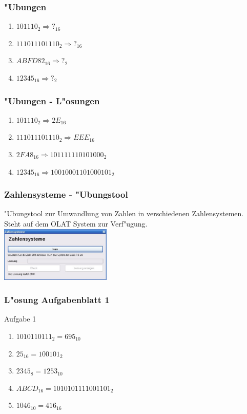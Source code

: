 \documentclass{beamer}
\begin{document}
\frame
{
	\frametitle{"Ubungen}
	\begin{enumerate}
	\item $101110_{2} \Rightarrow ?_{16}$
	\item $111011101110_{2} \Rightarrow ?_{16}$
	\item $ABFD82_{16} \Rightarrow ?_{2}$
	\item $12345_{16} \Rightarrow ?_{2}$
	\end{enumerate}
}

\frame
{
	\frametitle{"Ubungen - L"osungen}
	\begin{enumerate}
	\item $101110_{2} \Rightarrow 2E_{16}$
	\item $111011101110_{2} \Rightarrow EEE_{16}$
	\item $2FA8_{16} \Rightarrow 101111110101000_{2}$
	\item $12345_{16} \Rightarrow 10010001101000101_{2}$
	\end{enumerate}
}

\frame
{
	\frametitle{Zahlensysteme - "Ubungstool}
	"Ubungstool zur Umwandlung von Zahlen in verschiedenen Zahlensystemen. Steht auf dem OLAT System zur Verf"ugung.\\
	\includegraphics[width=150pt]{zahlensysteme.ps}
}

\frame
{
	\frametitle{L"osung Aufgabenblatt 1}
	Aufgabe 1
	\begin{enumerate}
	\item $1010110111_{2} = 695_{10}$
	\item $25_{16} = 100101_{2}$
	\item $2345_{8} = 1253_{10}$
	\item $ABCD_{16} = 1010101111001101_{2}$
	\item $1046_{10} = 416_{16}$
	\end{enumerate}
}
\end{document}
